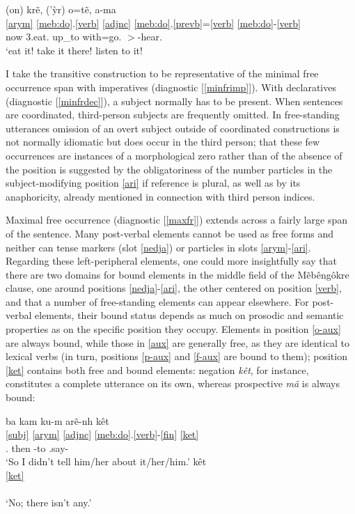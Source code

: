 \documentclass[output=paper]{langscibook}
\begin{document}
\ea\glll (on) krẽ, ('ỳr) o=tẽ, a-ma\\
      \ref{arym} \ref{meb:do}.\ref{verb} \ref{adjnc} \ref{meb:do}.\ref{prevb}=\ref{verb} \ref{meb:do}-\ref{verb}\\
      now 3.eat.\Fin{} up\_to with=go.\Fin{} \Second$>$\Third{}-hear.\Fin{}\\
    \glt `eat it! take it there! listen to it!
\z

I take the transitive construction to be representative of the minimal free occurrence span with imperatives (diagnostic [\ref{minfrimp}]). With declaratives (diagnostic [\ref{minfrdec}]), a subject normally has to be present. When sentences are coordinated, third-person subjects are frequently omitted. In free-standing utterances omission of an overt subject outside of coordinated constructions is not normally idiomatic but does occur in the third person; that these few occurrences are instances of a morphological zero rather than of the absence of the position is suggested by the obligatoriness of the number particles in the subject-modifying position \ref{ari} if reference is plural, as well as by its anaphoricity, already mentioned in connection with third person indices.


Maximal free occurrence (diagnostic [\ref{maxfr}]) extends across a fairly large span of the sentence. Many post-verbal elements cannot be used as free forms and neither can tense markers (slot \ref{nedja}) or particles in slots \ref{arym}-\ref{ari}. Regarding these left-peripheral elements, one could more insightfully say that there are two domains for bound elements in the middle field of the Mẽbêngôkre clause, one around positions \ref{nedja}-\ref{ari}, the other centered on position \ref{verb}, and that a number of free-standing elements can appear elsewhere. For post-verbal elements, their bound status depends as much on prosodic and semantic properties as on the specific position they occupy. Elements in position \ref{o-aux} are always bound, while those in \ref{aux} are generally free, as they are identical to lexical verbs (in turn, positions \ref{p-aux} and \ref{f-aux} are bound to them); position \ref{ket} contains both free and bound elements: negation {\em kêt}, for instance, constitutes a complete utterance on its own, whereas prospective {\em mã} is always bound:

\ea
    \ea\glll ba kam ku-m arẽ-nh kêt\\
        \ref{subj} \ref{arym} \ref{adjnc} \ref{meb:do}.\ref{verb}-\ref{fin} \ref{ket}\\
        \First.\Nom{} then \Third\Acc-to \Third.say-\Nfin{} \Neg{}\\
      \glt `So I didn't tell him/her about it/her/him.'
    \ex\glll kêt\\
        \ref{ket}\\
        \\
      \glt `No; there isn't any.'
    
\end{document}
